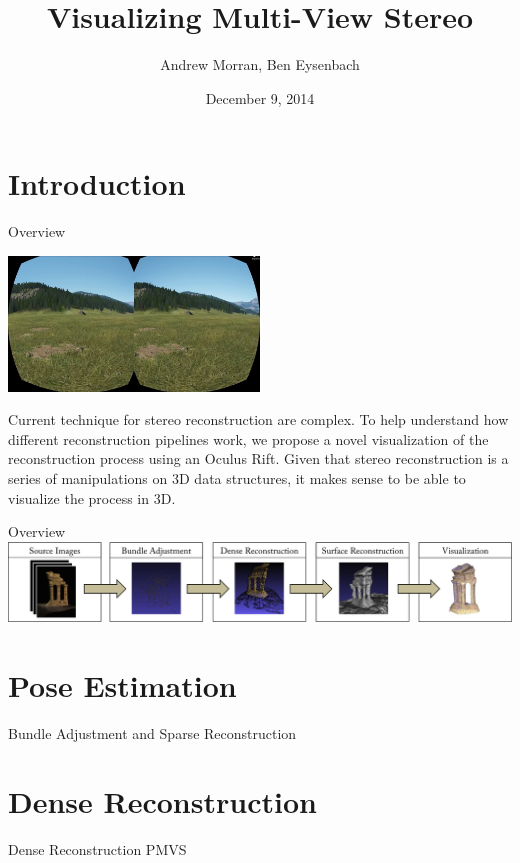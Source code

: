 \documentclass{beamer}
\begin{document}
\title{Visualizing Multi-View Stereo}
\author{Andrew Morran, Ben Eysenbach}
\date{December 9, 2014}

\frame{\titlepage}

\section{Introduction}

\begin{frame}{Overview}
  \begin{center}
    \includegraphics[width=0.5\textwidth]{rift.jpg}
  \end{center}

  Current technique for stereo reconstruction are complex. To help understand how different reconstruction pipelines work, we propose a novel visualization of the reconstruction process using an Oculus Rift. Given that stereo reconstruction is a series of manipulations on 3D data structures, it makes sense to be able to visualize the process in 3D.
\end{frame}


\begin{frame}{Overview}
  \includegraphics[width=\textwidth]{pipeline2.png}
  \tableofcontents  
\end{frame}

\section{Pose Estimation}

\begin{frame}{Bundle Adjustment and Sparse Reconstruction}
\end{frame}

\section{Dense Reconstruction}
\begin{frame}{Dense Reconstruction}
  PMVS
\end{frame}
\end{document}
